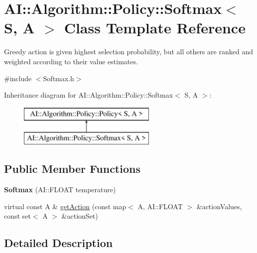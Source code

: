 \hypertarget{classAI_1_1Algorithm_1_1Policy_1_1Softmax}{\section{A\-I\-:\-:Algorithm\-:\-:Policy\-:\-:Softmax$<$ S, A $>$ Class Template Reference}
\label{classAI_1_1Algorithm_1_1Policy_1_1Softmax}
}


Greedy action is given highest selection probability, but all others are ranked and weighted according to their value estimates.  




{\ttfamily \#include $<$Softmax.\-h$>$}

Inheritance diagram for A\-I\-:\-:Algorithm\-:\-:Policy\-:\-:Softmax$<$ S, A $>$\-:\begin{figure}[H]
\begin{center}
\leavevmode
\includegraphics[height=2.000000cm]{classAI_1_1Algorithm_1_1Policy_1_1Softmax}
\end{center}
\end{figure}
\subsection*{Public Member Functions}
\begin{DoxyCompactItemize}
\item 
\hypertarget{classAI_1_1Algorithm_1_1Policy_1_1Softmax_a7f91fab0a3e3ae62fda6851f23170e9e}{{\bfseries Softmax} (A\-I\-::\-F\-L\-O\-A\-T temperature)}\label{classAI_1_1Algorithm_1_1Policy_1_1Softmax_a7f91fab0a3e3ae62fda6851f23170e9e}

\item 
virtual const A \& \hyperlink{classAI_1_1Algorithm_1_1Policy_1_1Softmax_adf507bcadedab2d33e3fcc0059918d19}{get\-Action} (const map$<$ A, A\-I\-::\-F\-L\-O\-A\-T $>$ \&action\-Values, const set$<$ A $>$ \&action\-Set)
\end{DoxyCompactItemize}


\subsection{Detailed Description}
